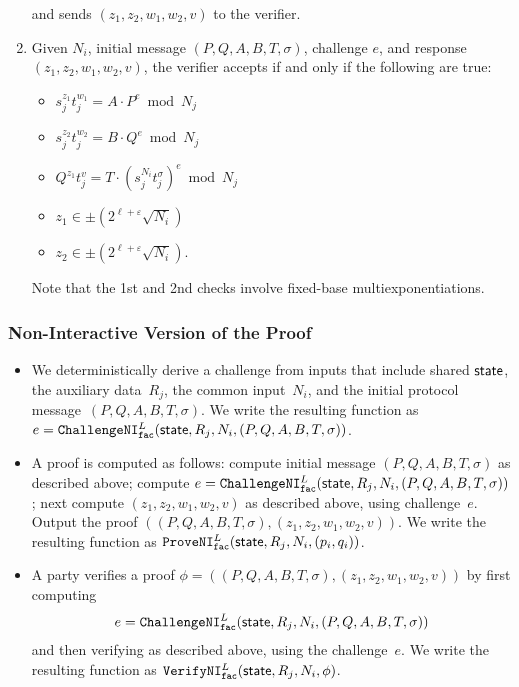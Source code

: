 \documentclass[11pt]{article}
\def\state{{\sf state}}
\newcommand{\challengeni}[1]{\ensuremath{\mathtt{ChallengeNI}_{\mathtt{#1}}}}
\newcommand{\proveni}[1]{\ensuremath{\mathtt{ProveNI}_{\mathtt{#1}}}}
\newcommand{\verifyni}[1]{\ensuremath{\mathtt{VerifyNI}_{\mathtt{#1}}}}
\newcommand{\?}[1]{\stackrel{?}{#1}}
\begin{document}
\begin{enumerate}
    and sends $(z_1, z_2, w_1, w_2, v)$ to the verifier.

  \item Given $N_i$, initial message $(P, Q, A, B, T, \sigma)$, challenge $e$, and response $(z_1, z_2, w_1, w_2, v)$, the verifier accepts if and only if the following are true: \begin{itemize}
\item    $s_j^{z_1} t_j^{w_1} = A \cdot P^e \bmod N_j$ 
\item    $s_j^{z_2} t_j^{w_2} = B \cdot Q^e \bmod N_j$ 
\item    $Q^{z_1} t_j^{v} = T \cdot (s_j^{N_i} t_j^\sigma)^e \bmod N_j$ 
\item    $z_1 \in \pm \left(2^{\ell + \varepsilon} \sqrt{N_i}\right)$ 
\item    $z_2 \in \pm \left(2^{\ell + \varepsilon} \sqrt{N_i}\right)$.
\end{itemize}
Note that the 1st and 2nd checks involve fixed-base multiexponentiations.

\end{enumerate}

\subsubsection{Non-Interactive Version of the Proof}

\begin{itemize}
  \item We deterministically derive a challenge from inputs that include shared $\state$, the auxiliary data~$R_j$, the common input~$N_i$, and the initial protocol message~$(P, Q, A, B, T, \sigma)$.
  We write the resulting function as
  $e=\challengeni{fac}^{L} (\state, R_j, N_i, (P, Q, A, B, T, \sigma))$.

 

  \item A proof is computed as follows:  compute initial message $(P, Q, A, B, T, \sigma)$ as described above; compute $e=\challengeni{fac}^{L} (\state, R_j, N_i, (P, Q, A, B, T, \sigma))$; next compute $(z_1, z_2, w_1, w_2, v)$ as described above, using challenge~$e$. Output the proof $((P, Q, A, B, T, \sigma), (z_1, z_2, w_1, w_2, v))$. We write the resulting function as $\proveni{fac}^{L}(\state, R_j, N_i, (p_i, q_i))$.

  \item A party verifies a proof $\phi=((P, Q, A, B, T, \sigma), (z_1, z_2, w_1, w_2, v))$ by first computing \[e=\challengeni{fac}^{L} (\state, R_j, N_i, (P, Q, A, B, T, \sigma))\] and then verifying as described above, using the challenge~$e$. We write the resulting function as $\verifyni{fac}^{L}(\state, R_j, N_i, \phi)$.
\end{itemize}
\end{document}
